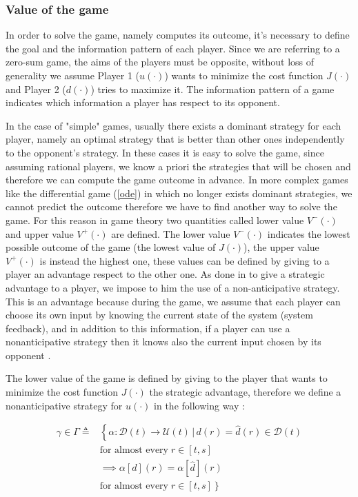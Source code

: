 \subsubsection{Value of the game}
In order to solve the game, namely computes its outcome, it's necessary to define the goal and the information pattern of each player. Since we are referring to a zero-sum game, the aims of the players must be opposite, without loss of generality we assume Player 1 ($u(\cdot)$) wants to minimize the cost function $J(\cdot)$ and Player 2 ($d(\cdot)$) tries to maximize it. The information pattern of a game indicates which information a player has respect to its opponent.

In the case of "simple" games, usually there exists a dominant strategy for each player, namely an optimal strategy that is better than other ones independently to the opponent's strategy. In these cases it is easy to solve the game, since assuming rational players, we know a priori the strategies that will be chosen and therefore we can compute the game outcome in advance. In more complex games like the differential game (\ref{ode}) in which no longer exists dominant strategies, we cannot predict the outcome therefore we have to find another way to solve the game. For this reason in game theory two quantities called lower value $V^-(\cdot)$ and upper value $V^+(\cdot)$ are defined. The lower value $V^-(\cdot)$ indicates the lowest possible outcome of the game (the lowest value of $J(\cdot)$), the upper value $V^+(\cdot)$ is instead the highest one, these values can be defined by giving to a player an advantage respect to the other one. As done in \cite{evans} \cite{reach_avoid_with_dist} \cite{brief_intro} to give a strategic advantage to a player, we impose to him the use of a non-anticipative strategy. This is an advantage because during the game, we assume that each player can choose its own input by knowing the current state of the system (system feedback), and in addition to this information, if a player can use a nonanticipative strategy then it knows also the current input chosen by its opponent \cite{mitchell_time_dep_HJ}.

The lower value of the game is defined by giving to the player that wants to minimize the cost function $J(\cdot)$ the strategic advantage, therefore we define a nonanticipative strategy for $u(\cdot)$ in the following way \cite{evans}:

\begin{equation}
	\label{eq:non_ant_stra_u}
	\begin{split}
		\gamma \in \Gamma \triangleq 
		& \left\{ 
			\alpha : \mathcal{D}(t) \rightarrow \mathcal{U}(t)\,|\,d(r) = \hat{d}(r) \in \mathcal{D}(t)
		\right. \\ 
		& \textrm{for almost every} \;r \in [t,s] \\
		& \implies \alpha[d](r)= \alpha[\hat{d}](r) \\
		& \left. 
			\textrm{for almost every} \; r \in [t,s] 
		\right\}  
	\end{split}
\end{equation}


